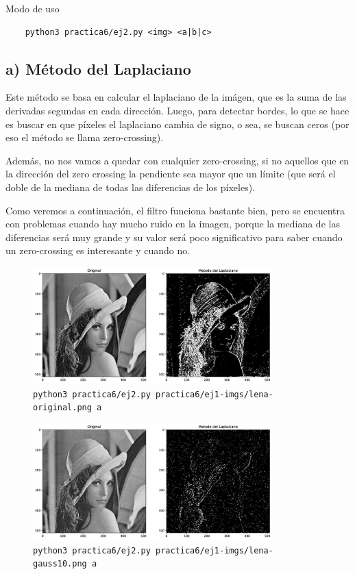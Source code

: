 \documentclass[11pt, spanish]{article}
\begin{document}
Modo de uso
\begin{verbatim}
    python3 practica6/ej2.py <img> <a|b|c>
\end{verbatim}


\newpage
\subsection{a) Método del Laplaciano}

Este método se basa en calcular el laplaciano de la imágen, que es la suma de las derivadas segundas en cada dirección.
Luego, para detectar bordes, lo que se hace  es buscar en que píxeles el laplaciano cambia de signo, o sea, se buscan ceros (por eso el método se llama zero-crossing).

Además, no nos vamos a quedar con cualquier zero-crossing, si no aquellos que en la dirección del zero crossing la pendiente sea mayor que un límite (que será el doble de la mediana de todas las diferencias de los píxeles).

Como veremos a continuación, el filtro funciona bastante bien, pero se encuentra con problemas cuando hay mucho ruido en la imagen, porque la mediana de las diferencias  será muy grande y su valor será poco significativo para saber cuando un zero-crossing es interesante y cuando no.


\begin{figure}[H]
\centering
    \includegraphics[height=4.5cm]{informe-imgs/ej2-a-lena-original.jpg}
    \caption{\texttt{python3 practica6/ej2.py practica6/ej1-imgs/lena-original.png a}}
\end{figure}

\begin{figure}[H]
\centering
    \includegraphics[height=4.5cm]{informe-imgs/ej2-a-lena-gauss10.jpg}
    \caption{\texttt{python3 practica6/ej2.py practica6/ej1-imgs/lena-gauss10.png a}}
\end{figure}
\end{document}
